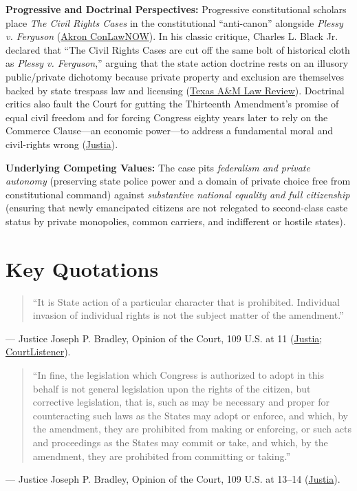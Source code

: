 \documentclass[12pt]{article}
\begin{document}
\textbf{Progressive and Doctrinal Perspectives:} Progressive constitutional scholars place \textit{The Civil Rights Cases} in the constitutional ``anti-canon'' alongside \textit{Plessy v. Ferguson} (\href{https://ideaexchange.uakron.edu/cgi/viewcontent.cgi?article=1127&context=conlawnow}{Akron ConLawNOW}). In his classic critique, Charles L. Black Jr. declared that ``The Civil Rights Cases are cut off the same bolt of historical cloth as \textit{Plessy v. Ferguson},'' arguing that the state action doctrine rests on an illusory public/private dichotomy because private property and exclusion are themselves backed by state trespass law and licensing (\href{https://scholarship.law.tamu.edu/cgi/viewcontent.cgi?article=1359&context=lawreview}{Texas A\&M Law Review}). Doctrinal critics also fault the Court for gutting the Thirteenth Amendment's promise of equal civil freedom and for forcing Congress eighty years later to rely on the Commerce Clause---an economic power---to address a fundamental moral and civil-rights wrong (\href{https://supreme.justia.com/cases/federal/us/379/241/}{Justia}).

\textbf{Underlying Competing Values:} The case pits \textit{federalism and private autonomy} (preserving state police power and a domain of private choice free from constitutional command) against \textit{substantive national equality and full citizenship} (ensuring that newly emancipated citizens are not relegated to second-class caste status by private monopolies, common carriers, and indifferent or hostile states).

\section{Key Quotations}

\begin{quote}
``It is State action of a particular character that is prohibited. Individual invasion of individual rights is not the subject matter of the amendment.''
\end{quote}
\noindent --- Justice Joseph P. Bradley, Opinion of the Court, 109 U.S. at 11 (\href{https://supreme.justia.com/cases/federal/us/109/3/}{Justia}; \href{https://www.courtlistener.com/opinion/90897/civil-rights-cases/}{CourtListener}).

\begin{quote}
``In fine, the legislation which Congress is authorized to adopt in this behalf is not general legislation upon the rights of the citizen, but corrective legislation, that is, such as may be necessary and proper for counteracting such laws as the States may adopt or enforce, and which, by the amendment, they are prohibited from making or enforcing, or such acts and proceedings as the States may commit or take, and which, by the amendment, they are prohibited from committing or taking.''
\end{quote}
\noindent --- Justice Joseph P. Bradley, Opinion of the Court, 109 U.S. at 13--14 (\href{https://supreme.justia.com/cases/federal/us/109/3/}{Justia}).
\end{document}

